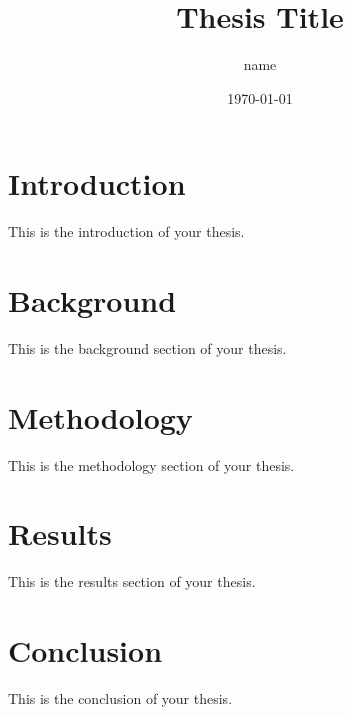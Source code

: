\documentclass{report}
\title{Thesis Title}
\author{name}
\date{\today}
\begin{document}
\maketitle

\chapter{Introduction}
This is the introduction of your thesis.

\chapter{Background}
This is the background section of your thesis.

\chapter{Methodology}
This is the methodology section of your thesis.

\chapter{Results}
This is the results section of your thesis.

\chapter{Conclusion}
This is the conclusion of your thesis.
\end{document}
